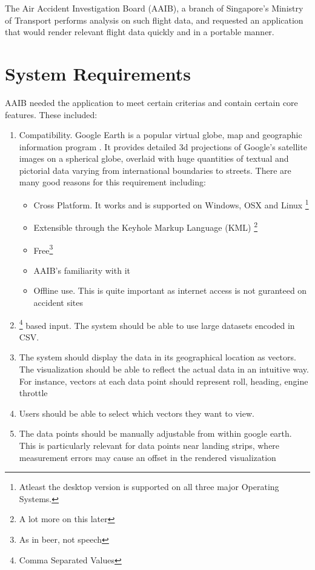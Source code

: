 The Air Accident Investigation Board (AAIB), a branch of Singapore's Ministry of Transport performs analysis on such flight data, and requested an application that would render relevant flight data quickly and in a portable manner. \\

\section{System Requirements}

AAIB needed the application to meet certain criterias and contain certain core features. These included:

\begin{enumerate}
  \item {} Compatibility. Google Earth is a popular virtual globe, map and geographic information program \citep{google:earth}. It provides detailed 3d projections of Google's satellite images on a spherical globe, overlaid with huge quantities of textual and pictorial data varying from international boundaries to streets. There are many good reasons for this requirement including:
    \begin{itemize}
      \item Cross Platform. It works and is supported on Windows, OSX and Linux \footnote{Atleast the desktop version is supported on all three major Operating Systems.}
      \item Extensible through the Keyhole Markup Language (KML) \footnote{A lot more on this later}
      \item Free\footnote{As in beer, not speech}
      \item AAIB's familiarity with it
      \item Offline use. This is quite important as internet access is not guranteed on accident sites
    \end{itemize}
  \item {}\footnote{Comma Separated Values} based input. The system should be able to use large datasets encoded in CSV.
  \item  The system should display the data in its geographical location as vectors. The visualization should be able to reflect the actual data in an intuitive way. For instance, vectors at each data point should represent roll, heading, engine throttle
  \item Users should be able to select which vectors they want to view.
  \item The data points should be manually adjustable from within google earth. This is particularly relevant for data points near landing strips, where measurement errors may cause an offset in the rendered visualization

\end{enumerate}
